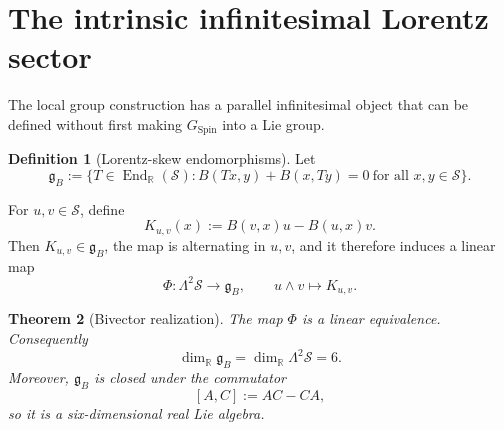 \documentclass[11pt,a4paper]{article}
\newtheorem{theorem}{Theorem}[section]
\theoremstyle{definition}
\newtheorem{definition}[theorem]{Definition}
\theoremstyle{remark}
\newcommand{\R}{\mathbb{R}}
\newcommand{\Smodel}{\mathcal{S}}
\newcommand{\SpinG}{G_{\mathrm{Spin}}}
\newcommand{\End}{\operatorname{End}}
\newcommand{\gB}{\mathfrak{g}_{B}}
\begin{document}
\section{The intrinsic infinitesimal Lorentz sector}
\label{sec:lie}

The local group construction has a parallel infinitesimal object that can
be defined without first making \(\SpinG\) into a Lie group.

\begin{definition}[Lorentz-skew endomorphisms]
\label{def:gB}
Let
\[
   \gB
   :=
   \bigl\{
      T\in\End_{\R}(\Smodel):
      B(Tx,y)+B(x,Ty)=0
      \ \text{for all }x,y\in\Smodel
   \bigr\}.
\tag{4.1}
\]
\end{definition}

For \(u,v\in\Smodel\), define
\[
   K_{u,v}(x)
   :=
   B(v,x)u-B(u,x)v.
\tag{4.2}\label{eq:Kuv}
\]
Then \(K_{u,v}\in\gB\), the map is alternating in \(u,v\), and it therefore
induces a linear map
\[
   \Phi:\Lambda^{2}\Smodel\longrightarrow\gB,
   \qquad
   u\wedge v\longmapsto K_{u,v}.
\tag{4.3}
\]

\begin{theorem}[Bivector realization]
\label{thm:bivector}
The map \(\Phi\) is a linear equivalence.  Consequently
\[
   \dim_{\R}\gB
   =
   \dim_{\R}\Lambda^{2}\Smodel
   =6.
\tag{4.4}
\]
Moreover, \(\gB\) is closed under the commutator
\[
   [A,C]:=AC-CA,
\tag{4.5}
\]
so it is a six-dimensional real Lie algebra.
\end{theorem}
\end{document}
